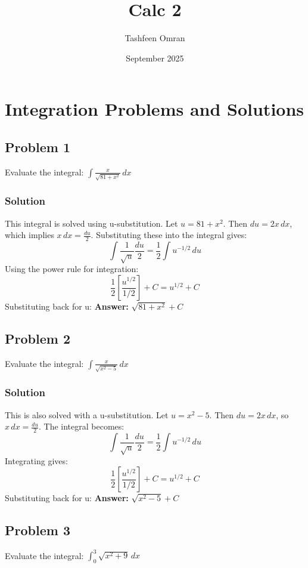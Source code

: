 \documentclass{article}
\title{Calc 2}
\author{Tashfeen Omran}
\date{September 2025}
\begin{document}
\maketitle

\section{Integration Problems and Solutions}

\subsection{Problem 1}
Evaluate the integral: $ \int \frac{x}{\sqrt{81 + x^2}} \,dx $
\subsubsection*{Solution}
This integral is solved using u-substitution.
Let $ u = 81 + x^2 $.
Then $ du = 2x \,dx $, which implies $ x \,dx = \frac{du}{2} $.
Substituting these into the integral gives:
\[ \int \frac{1}{\sqrt{u}} \frac{du}{2} = \frac{1}{2} \int u^{-1/2} \,du \]
Using the power rule for integration:
\[ \frac{1}{2} \left[ \frac{u^{1/2}}{1/2} \right] + C = u^{1/2} + C \]
Substituting back for u:
\textbf{Answer:} $ \sqrt{81 + x^2} + C $
 

\subsection{Problem 2}
Evaluate the integral: $ \int \frac{x}{\sqrt{x^2 - 5}} \,dx $
\subsubsection*{Solution}
This is also solved with a u-substitution.
Let $ u = x^2 - 5 $.
Then $ du = 2x \,dx $, so $ x \,dx = \frac{du}{2} $.
The integral becomes:
\[ \int \frac{1}{\sqrt{u}} \frac{du}{2} = \frac{1}{2} \int u^{-1/2} \,du \]
Integrating gives:
\[ \frac{1}{2} \left[ \frac{u^{1/2}}{1/2} \right] + C = u^{1/2} + C \]
Substituting back for u:
\textbf{Answer:} $ \sqrt{x^2 - 5} + C $
 

\subsection{Problem 3}
Evaluate the integral: $ \int_{0}^{3} \sqrt{x^2 + 9} \,dx $
\end{document}
